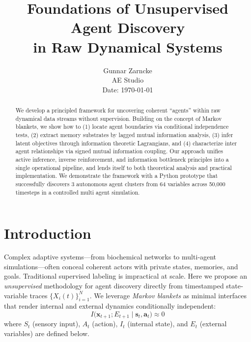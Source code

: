 \documentclass[10pt,conference]{IEEEtran}
\newcommand{\hstate}{\mathbf x}        %
\newcommand{\obs}{\mathbf s}           %
\newcommand{\act}{\mathbf a}           %
\newcommand{\Sens}{\obs}
\newcommand{\Act}{\act}
\newcommand{\Int}{\hstate}
\begin{document}
\title{Foundations of Unsupervised Agent Discovery\\in Raw Dynamical Systems}

\author{Gunnar Zarncke\\
AE Studio\\
\small{Date: \today}}

\maketitle

\begin{abstract}
We develop a principled framework for uncovering coherent ``agents'' within raw dynamical data streams without supervision. Building on the concept of Markov blankets, we show how to (1) locate agent boundaries via conditional independence tests, (2) extract memory substrates by lagged mutual information analysis, (3) infer latent objectives through information theoretic Lagrangians, and (4) characterize inter agent relationships via signed mutual information coupling. Our approach unifies active inference, inverse reinforcement, and information bottleneck principles into a single operational pipeline, and lends itself to both theoretical analysis and practical implementation. We demonstrate the framework with a Python prototype that successfully discovers 3 autonomous agent clusters from 64 variables across 50,000 timesteps in a controlled multi agent simulation.
\end{abstract}

\section{Introduction}
Complex adaptive systems—from biochemical networks to multi‐agent simulations—often conceal coherent actors with private states, memories, and goals.  Traditional supervised labeling is impractical at scale.  Here we propose an \emph{unsupervised} methodology for agent discovery directly from timestamped state‐variable traces $\{X_i(t)\}_{i=1}^N$.  We leverage \emph{Markov blankets} \cite{ConantAshby1970,Friston2010} as minimal interfaces that render internal and external dynamics conditionally independent:
\begin{equation}
I\bigl(\Int_{t+1};E_{t+1}\mid\Sens_t,\Act_t\bigr)\approx0
\end{equation}
where $S_t$ (sensory input), $A_t$ (action), $I_t$ (internal state), and $E_t$ (external variables) \cite{Kirchhoff2018} are defined below.
\end{document}
